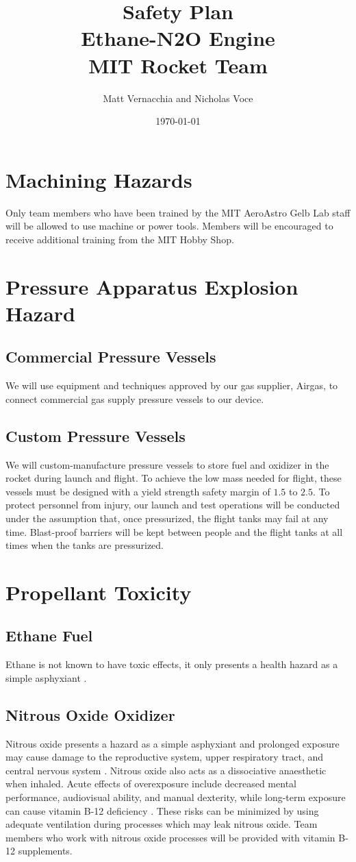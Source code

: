 \documentclass{article}
\title{Safety Plan \\ Ethane-N2O Engine \\ MIT Rocket Team} %
\author{Matt Vernacchia and Nicholas Voce} %
\date{ \today } %
\begin{document}
\maketitle
\section{Machining Hazards}
Only team members who have been trained by the MIT AeroAstro Gelb Lab staff will be allowed to use machine or power tools. Members will be encouraged to receive additional training from the MIT Hobby Shop.

\section{Pressure Apparatus Explosion Hazard}
\subsection{Commercial Pressure Vessels}
We will use equipment and techniques approved by our gas supplier, Airgas, to connect commercial gas supply pressure vessels to our device.
\subsection{Custom Pressure Vessels}
We will custom-manufacture pressure vessels to store fuel and oxidizer in the rocket during launch and flight. To achieve the low mass needed for flight, these vessels must be designed with a yield strength safety margin of $1.5$ to $2.5$. To protect personnel from injury, our launch and test operations will be conducted under the assumption that, once pressurized, the flight tanks may fail at any time. Blast-proof barriers will be kept between people and the flight tanks at all times when the tanks are pressurized.

\section{Propellant Toxicity}
\subsection{Ethane Fuel}
Ethane is not known to have toxic effects, it only presents a health hazard as a simple asphyxiant \cite{EthaneMSDS}.
\subsection{Nitrous Oxide Oxidizer}
Nitrous oxide presents a hazard as a simple asphyxiant and prolonged exposure may cause damage to the reproductive system, upper respiratory tract, and central nervous system \cite{N2OMSDS}. Nitrous oxide also acts as a dissociative anaesthetic when inhaled. Acute effects of overexposure include decreased mental performance, audiovisual ability, and manual dexterity, while long-term exposure can cause vitamin B-12 deficiency \cite{NIOSH}. These risks can be minimized by using adequate ventilation during processes which may leak nitrous oxide. Team members who work with nitrous oxide processes will be provided with vitamin B-12 supplements.
\end{document}
